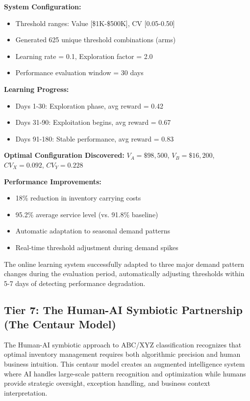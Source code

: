 \documentclass{article}
\begin{document}
\textbf{System Configuration:}
\begin{itemize}
    \item Threshold ranges: Value [\$1K-\$500K], CV [0.05-0.50]
    \item Generated 625 unique threshold combinations (arms)
    \item Learning rate = 0.1, Exploration factor = 2.0
    \item Performance evaluation window = 30 days
\end{itemize}

\textbf{Learning Progress:}
\begin{itemize}
    \item Days 1-30: Exploration phase, avg reward = 0.42
    \item Days 31-90: Exploitation begins, avg reward = 0.67
    \item Days 91-180: Stable performance, avg reward = 0.83
\end{itemize}

\textbf{Optimal Configuration Discovered:}
$V_A = \$98,500$, $V_B = \$16,200$, $CV_X = 0.092$, $CV_Y = 0.228$

\textbf{Performance Improvements:}
\begin{itemize}
    \item 18\% reduction in inventory carrying costs
    \item 95.2\% average service level (vs. 91.8\% baseline)
    \item Automatic adaptation to seasonal demand patterns
    \item Real-time threshold adjustment during demand spikes
\end{itemize}

The online learning system successfully adapted to three major demand pattern changes during the evaluation period, automatically adjusting thresholds within 5-7 days of detecting performance degradation.

\subsection{Tier 7: The Human-AI Symbiotic Partnership (The Centaur Model)}

The Human-AI symbiotic approach to ABC/XYZ classification recognizes that optimal inventory management requires both algorithmic precision and human business intuition. This centaur model creates an augmented intelligence system where AI handles large-scale pattern recognition and optimization while humans provide strategic oversight, exception handling, and business context interpretation.
\end{document}
